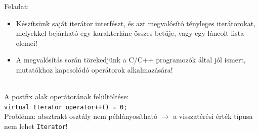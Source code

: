 \begin{frame}
    Feladat:
    \begin{itemize}
        \item Készítsünk saját iterátor interfészt, és azt megvalósító tényleges iterátorokat, melyekkel bejárható egy karakterlánc összes betűje, vagy egy láncolt lista elemei!
        \item A megvalósítás során törekedjünk a C/C++ programozók által jól ismert, mutatókhoz kapcsolódó operátorok alkalmazására!
    \end{itemize}
\end{frame}

\begin{frame}
    \begin{exampleblock}{}
        
    \end{exampleblock}
\end{frame}

\begin{frame}
    \begin{description}[m]
        \item[\texttt{operator++}] \hfill \\ A postfix alak operátorának felültöltése:\\ \texttt{virtual Iterator operator++() = 0;} \\
            Probléma: absztrakt osztály nem példányosítható $\to$ a visszatérési érték típusa nem lehet \texttt{Iterator}! 
    \end{description}
    \begin{exampleblock}{}
        \small
        
    \end{exampleblock}
\end{frame}

